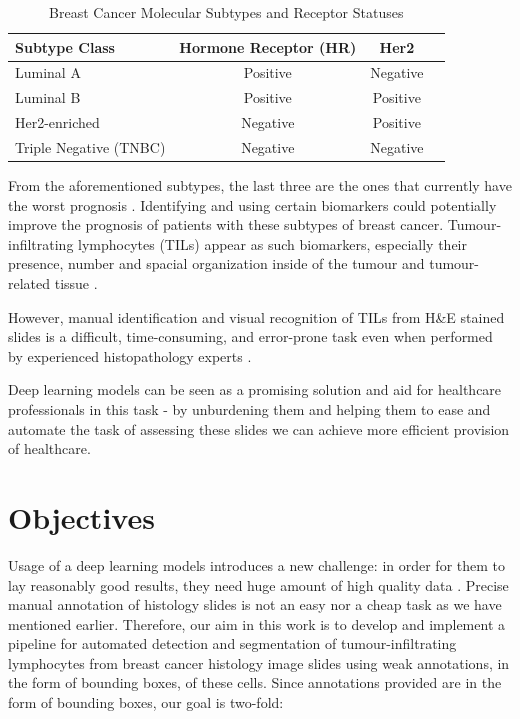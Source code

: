 \begin{table}[H]
    \centering
    \caption{Breast Cancer Molecular Subtypes and Receptor Statuses}
    \label{tab:breast_cancer_subtypes}
    \begin{tabular}{|l|c|c|c|}
        \hline
        \textbf{Subtype Class} & \textbf{Hormone Receptor (HR)} & \textbf{Her2} \\
        \hline
        Luminal A & Positive & Negative \\
        \hline
        Luminal B & Positive & Positive \\
        \hline
        Her2-enriched & Negative & Positive \\
        \hline
        Triple Negative (TNBC) & Negative & Negative \\
        \hline
    \end{tabular}
\end{table}

From the aforementioned subtypes, the last three are the ones that currently have the worst prognosis \cite{Schalper2022, Zhang2024}. Identifying and using certain biomarkers could potentially improve the prognosis of patients with these subtypes of breast cancer. Tumour-infiltrating lymphocytes (TILs) appear as such biomarkers, especially their presence, number and spacial organization inside of the tumour and tumour-related tissue \cite{Salgado2015, Denkert2018, Amgad2019}.

However, manual identification and visual recognition of TILs from H\&E stained slides is a difficult, time-consuming, and error-prone task even when performed by experienced histopathology experts \cite{Salgado2015, Amgad2019}.

Deep learning models can be seen as a promising solution and aid for healthcare professionals in this task - by unburdening them and helping them to ease and automate the task of assessing these slides we can achieve more efficient provision of healthcare.

\section{Objectives}
Usage of a deep learning models introduces a new challenge: in order for them to lay reasonably good results, they need huge amount of high quality data \cite{}. Precise manual annotation of histology slides is not an easy nor a cheap task as we have mentioned earlier. Therefore, our aim in this work is to develop and implement a pipeline for automated detection and segmentation of tumour-infiltrating lymphocytes from breast cancer histology image slides using weak annotations, in the form of bounding boxes, of these cells. Since annotations provided are in the form of bounding boxes, our goal is two-fold:

